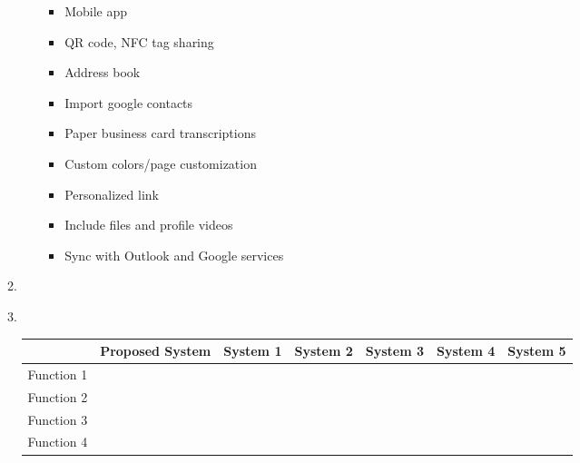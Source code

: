 \documentclass[12pt]{article}%
\begin{document}
\begin{enumerate}
\begin{enumerate}
\begin{enumerate}
                \begin{itemize}
                    \item Mobile app
                    \item QR code, NFC tag sharing
                    \item Address book
                    \item Import google contacts
                    \item Paper business card transcriptions
                    \item Custom colors/page customization
                    \item Personalized link
                    \item Include files and profile videos
                    \item Sync with Outlook and Google services
                \end{itemize}
            \end{enumerate}
            \item 
            \item \hspace{1cm} \\
            \begin{tabular}{|l|l|l|l|l|l|l|}
                \hline
                 & Proposed System & System 1 & System 2 & System 3 & System 4 & System 5 \\
                 \hline
                Function 1 & \\
                Function 2 & \\
                Function 3 & \\
                Function 4 & \\
                 \hline
            \end{tabular}
        \end{enumerate}

    
\end{enumerate}

\end{document}
